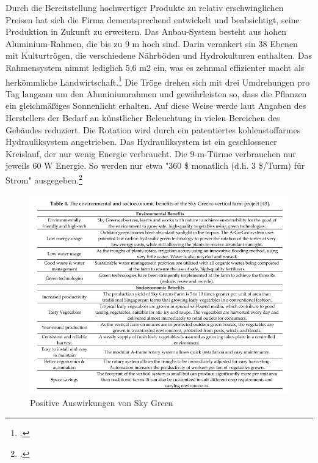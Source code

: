 \documentclass{scrartcl}
\begin{document}
Durch die Bereitstellung hochwertiger Produkte zu relativ erschwinglichen Preisen hat sich die Firma dementsprechend entwickelt und beabsichtigt, seine Produktion in Zukunft zu erweitern. Das Anbau-System besteht aus hohen Aluminium-Rahmen, die bis zu 9 m hoch sind. Darin verankert sin 38 Ebenen mit Kulturtrögen, die verschiedene Nährböden und Hydrokulturen enthalten. Das Rahmensystem nimmt lediglich 5,6 m2 ein, was es zehnmal effizienter macht als herkömmliche
Landwirtschaft.\footcite{SkyGreens} Die Tröge drehen sich mit drei Umdrehungen pro Tag langsam um den Aluminiumrahmen und gewährleisten so, dass die Pflanzen ein gleichmäßiges Sonnenlicht erhalten. Auf diese Weise werde laut Angaben des Herstellers der Bedarf an künstlicher Beleuchtung in vielen Bereichen des Gebäudes reduziert. Die Rotation wird durch ein patentiertes kohlenstoffarmes Hydrauliksystem angetrieben. Das Hydrauliksystem ist ein geschlossener Kreislauf, der nur wenig Energie verbraucht. Die 9-m-Türme verbrauchen nur jeweils 60 W Energie. So werden nur etwa "360 \$ monatlich (d.h. 3 \$/Turm) für Strom" ausgegeben.\footcite{SkyGreens}
\begin{figure}[htbp]
\centering
\includegraphics[width=16cm]{image_folder/skygreenbenefits.png}
\caption{Positive Auswirkungen von Sky Green }
\label{fig:Positive Auswirkungen von Sky Green}
\end{figure}
\end{document}
